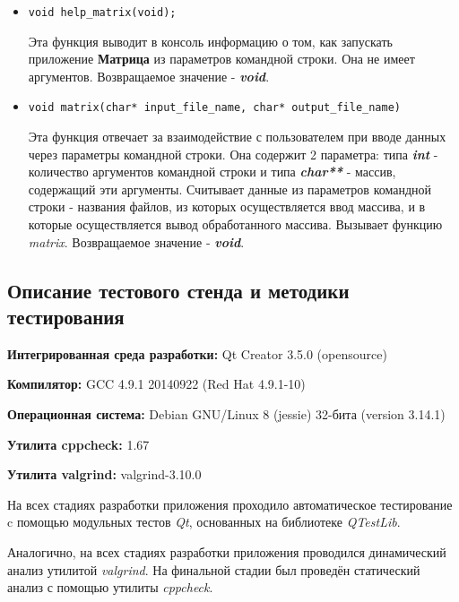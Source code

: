 \documentclass[12pt,a4paper]{report}
\begin{document}
\begin{enumerate}
\begin{itemize}
\item \verb-void help_matrix(void);-

Эта функция выводит в консоль информацию о том, как запускать приложение \textbf{Матрица} из параметров командной строки. Она не имеет аргументов. Возвращаемое значение - \textit{\textbf{void}}.
\end{itemize}

\begin{itemize}
\item \verb-void matrix(char* input_file_name, char* output_file_name)-

Эта функция отвечает за взаимодействие с пользователем при вводе данных через параметры командной строки. Она содержит 2 параметра: типа \textbf{\textit{int}} - количество аргументов командной строки и типа \textbf{\textit{char**}} - массив, содержащий эти аргументы. Считывает данные из параметров командной строки - названия файлов, из которых осуществляется ввод массива, и в которые осуществляется вывод обработанного массива. Вызывает функцию \textit{matrix}. Возвращаемое значение - \textit{\textbf{void}}.
\end{itemize}
\end{enumerate}
\subsection{Описание тестового стенда и методики тестирования}

\begin{flushleft}
\textbf{Интегрированная среда разработки:} Qt Creator 3.5.0 (opensource)

\textbf{Компилятор:} GCC 4.9.1 20140922 (Red Hat 4.9.1-10)

\textbf{Операционная система:} Debian GNU/Linux 8 (jessie) 32-бита (version 3.14.1)

\textbf{Утилита cppcheck:} 1.67

\textbf{Утилита valgrind:} valgrind-3.10.0
\end{flushleft}

На всех стадиях разработки приложения проходило автоматическое тестирование c помощью модульных тестов \textit{Qt}, основанных на библиотеке  \textit{QTestLib}.

Аналогично, на всех стадиях разработки приложения проводился динамический анализ утилитой \textit{valgrind}.
На финальной стадии был проведён статический анализ с помощью утилиты \textit{cppcheck}.
\end{document}

